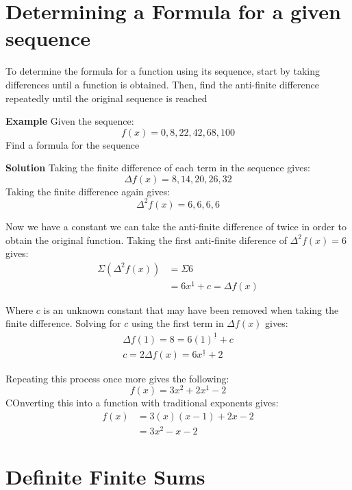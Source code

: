 \section{Determining a Formula for a given sequence}
To determine the formula for a function using its sequence, start by taking differences until a function is obtained. Then, find the anti-finite difference repeatedly until the original sequence is reached

\textbf{Example}
Given the sequence: \[f(x) = 0,8,22,42,68,100\]
Find a formula for the sequence

\textbf{Solution}
Taking the finite difference of each term in the sequence gives:
\[\Delta f(x) = 8, 14, 20, 26, 32\]
Taking the finite difference again gives:
\[\Delta^2 f(x) = 6, 6, 6, 6\]

Now we have a constant we can take the anti-finite difference of twice in order to obtain the original function. Taking the first anti-finite diference of \(\Delta^2 f(x) = 6\) gives:
\begin{align*}
    \Sigma(\Delta^2 f(x)) & = \Sigma 6 \\
    & = 6x^{\underline{1}} + c = \Delta f(x)
\end{align*}

Where \(c\) is an unknown constant that may have been removed when taking the finite difference. Solving for \(c\) using the first term in \(\Delta f(x)\) gives:
\begin{align*}
    \Delta f(1) = 8 = 6(1)^{\underline{1}} + c \\
    c = 2
    \Delta f(x) = 6x^{\underline{1}} + 2
\end{align*}

Repeating this process once more gives the following: \[f(x) = 3x^{\underline{2}} + 2x^{\underline{1}} - 2\]
COnverting this into a function with traditional exponents gives: 
\begin{align*}
    f(x) & = 3(x)(x-1) + 2x - 2 \\
    & = 3x^2 - x - 2
\end{align*}

\section{Definite Finite Sums}
